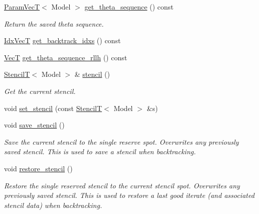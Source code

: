 \begin{DoxyCompactItemize}
\hyperlink{namespacemappel_a0f86d3153e4e27b095012f140eea58de}{Param\+VecT}$<$ Model $>$ \hyperlink{classmappel_1_1IterativeMaximizer_1_1MaximizerData_aade1d8879a22dff77c2707b379b2203e}{get\+\_\+theta\+\_\+sequence} () const 
\begin{DoxyCompactList}\small\item\em Return the saved theta sequence. \end{DoxyCompactList}\item 
\hyperlink{namespacemappel_ac63743dcd42180127307cd0e4ecdd784}{Idx\+VecT} \hyperlink{classmappel_1_1IterativeMaximizer_1_1MaximizerData_ac9d06c390f911f733c3912dbdcbae954}{get\+\_\+backtrack\+\_\+idxs} () const 
\item 
\hyperlink{namespacemappel_a2225ad69f358daa3f4f99282a35b9a3a}{VecT} \hyperlink{classmappel_1_1IterativeMaximizer_1_1MaximizerData_adda45df3816750fa019f25ff46bf9809}{get\+\_\+theta\+\_\+sequence\+\_\+rllh} () const 
\item 
\hyperlink{namespacemappel_a3a06598240007876f8c4bf834ad86197}{StencilT}$<$ Model $>$ \& \hyperlink{classmappel_1_1IterativeMaximizer_1_1MaximizerData_a29ccc1aa8e5ecf505f4ca76f6b8b214e}{stencil} ()
\begin{DoxyCompactList}\small\item\em Get the current stencil. \end{DoxyCompactList}\item 
void \hyperlink{classmappel_1_1IterativeMaximizer_1_1MaximizerData_a295d06c20f4d620602eece746f4c7d85}{set\+\_\+stencil} (const \hyperlink{namespacemappel_a3a06598240007876f8c4bf834ad86197}{StencilT}$<$ Model $>$ \&s)
\item 
void \hyperlink{classmappel_1_1IterativeMaximizer_1_1MaximizerData_a0349ede0482bdc352643e1eba2ab3f11}{save\+\_\+stencil} ()
\begin{DoxyCompactList}\small\item\em Save the current stencil to the single reserve spot. Overwrites any previously saved stencil. This is used to save a stencil when backtracking. \end{DoxyCompactList}\item 
void \hyperlink{classmappel_1_1IterativeMaximizer_1_1MaximizerData_a5f65e52de343dbd012c3b3a7b463b792}{restore\+\_\+stencil} ()
\begin{DoxyCompactList}\small\item\em Restore the single reserved stencil to the current stencil spot. Overwrites any previously saved stencil. This is used to restore a last good iterate (and associated stencil data) when backtracking. \end{DoxyCompactList}\item 

\end{DoxyCompactItemize}
